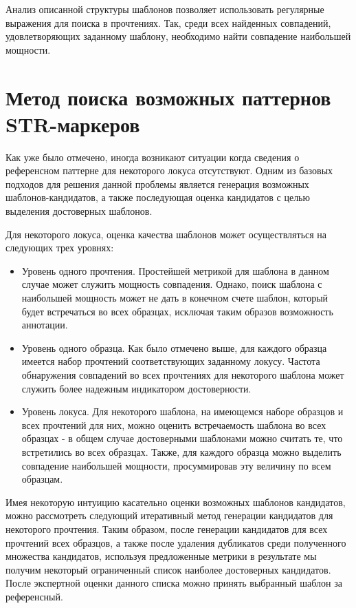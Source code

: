 Анализ описанной структуры шаблонов позволяет использовать регулярные выражения для поиска в прочтениях.
Так, среди всех найденных совпадений, удовлетворяющих заданному шаблону, необходимо найти
совпадение наибольшей мощности.

\section{Метод поиска возможных паттернов STR-маркеров}

Как уже было отмечено, иногда возникают ситуации когда сведения о референсном паттерне для
некоторого локуса отсутствуют. Одним из базовых подходов для решения данной проблемы является
генерация возможных шаблонов-кандидатов, а также последующая оценка кандидатов с целью выделения
достоверных шаблонов.

Для некоторого локуса, оценка качества шаблонов может осуществляться на следующих трех уровнях:
\begin{itemize}
\item Уровень одного прочтения. Простейшей метрикой для шаблона в данном случае может служить
мощность совпадения. Однако, поиск шаблона с наибольшей мощность может не дать в конечном счете
шаблон, который будет встречаться во всех образцах, исключая таким образов возможность аннотации.

\item Уровень одного образца. Как было отмечено выше, для каждого образца имеется
набор прочтений соответствующих заданному локусу. Частота обнаружения совпадений
во всех прочтениях для некоторого шаблона может служить более надежным индикатором
достоверности.

\item Уровень локуса. Для некоторого шаблона, на имеющемся наборе образцов и всех прочтений
для них, можно оценить встречаемость шаблона во всех образцах - в общем случае достоверными шаблонами можно считать
те, что встретились во всех образцах. Также, для каждого образца можно выделить совпадение наибольшей мощности,
просуммировав эту величину по всем образцам.
\end{itemize}

Имея некоторую интуицию касательно оценки возможных шаблонов кандидатов, можно рассмотреть
следующий итеративный метод генерации кандидатов для некоторого прочтения. Таким образом, после генерации
кандидатов для всех прочтений всех образцов, а также после удаления дубликатов среди полученного
множества кандидатов, используя предложенные метрики в результате мы получим некоторый
ограниченный список наиболее достоверных кандидатов. После экспертной оценки данного списка
можно принять выбранный шаблон за референсный.

